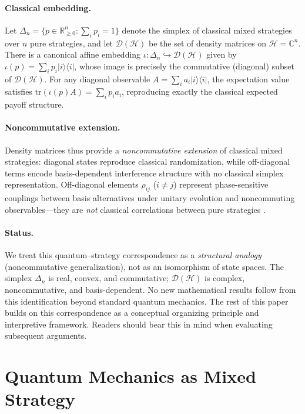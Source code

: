 \documentclass[12pt,a4paper]{article}
\theoremstyle{remark}
\begin{document}
\paragraph{Classical embedding.}
Let $\Delta_n = \{p \in \mathbb{R}_{\geq 0}^n : \sum_i p_i = 1\}$ denote the simplex of classical mixed strategies over $n$ pure strategies, and let $\mathcal{D}(\mathcal{H})$ be the set of density matrices on $\mathcal{H} = \mathbb{C}^n$. There is a canonical affine embedding $\iota: \Delta_n \hookrightarrow \mathcal{D}(\mathcal{H})$ given by $\iota(p) = \sum_i p_i |i\rangle\langle i|$, whose image is precisely the commutative (diagonal) subset of $\mathcal{D}(\mathcal{H})$. For any diagonal observable $A = \sum_i a_i |i\rangle\langle i|$, the expectation value satisfies $\mathrm{tr}(\iota(p) A) = \sum_i p_i a_i$, reproducing exactly the classical expected payoff structure.

\paragraph{Noncommutative extension.}
Density matrices thus provide a \emph{noncommutative extension} of classical mixed strategies: diagonal states reproduce classical randomization, while off-diagonal terms encode basis-dependent interference structure with no classical simplex representation. Off-diagonal elements $\rho_{ij}$ ($i \neq j$) represent phase-sensitive couplings between basis alternatives under unitary evolution and noncommuting observables---they are \emph{not} classical correlations between pure strategies \citep{Lindblad2015}.

\paragraph{Status.}
We treat this quantum--strategy correspondence as a \emph{structural analogy} (noncommutative generalization), not as an isomorphism of state spaces. The simplex $\Delta_n$ is real, convex, and commutative; $\mathcal{D}(\mathcal{H})$ is complex, noncommutative, and basis-dependent. No new mathematical results follow from this identification beyond standard quantum mechanics. The rest of this paper builds on this correspondence as a conceptual organizing principle and interpretive framework. Readers should bear this in mind when evaluating subsequent arguments.

\section{Quantum Mechanics as Mixed Strategy}
\label{sec:quantum}
\end{document}
